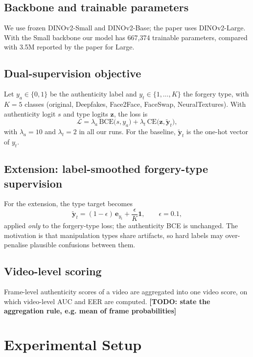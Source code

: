 \documentclass[lettersize,journal]{IEEEtran}
\newcommand{\todo}[1]{\textbf{[TODO: #1]}}
\begin{document}
\subsection{Backbone and trainable parameters}
We use frozen DINOv2-Small and DINOv2-Base; the paper uses DINOv2-Large. With the Small backbone our model has 667{,}374 trainable parameters, compared with 3.5M reported by the paper for Large.

\subsection{Dual-supervision objective}
Let $y_a\in\{0,1\}$ be the authenticity label and $y_t\in\{1,\dots,K\}$ the forgery type, with $K=5$ classes (original, Deepfakes, Face2Face, FaceSwap, NeuralTextures). With authenticity logit $s$ and type logits $\mathbf{z}$, the loss is
\begin{equation}
\mathcal{L}=\lambda_a\,\mathrm{BCE}\big(s,y_a\big)+\lambda_t\,\mathrm{CE}\big(\mathbf{z},\tilde{\mathbf{y}}_t\big),
\label{eq:loss}
\end{equation}
with $\lambda_a=10$ and $\lambda_t=2$ in all our runs. For the baseline, $\tilde{\mathbf{y}}_t$ is the one-hot vector of $y_t$.

\subsection{Extension: label-smoothed forgery-type supervision}
For the extension, the type target becomes
\begin{equation}
\tilde{\mathbf{y}}_t=(1-\epsilon)\,\mathbf{e}_{y_t}+\frac{\epsilon}{K}\mathbf{1},\qquad \epsilon=0.1,
\label{eq:ls}
\end{equation}
applied \emph{only} to the forgery-type loss; the authenticity BCE is unchanged. The motivation is that manipulation types share artifacts, so hard labels may over-penalise plausible confusions between them.

\subsection{Video-level scoring}
Frame-level authenticity scores of a video are aggregated into one video score, on which video-level AUC and EER are computed. \todo{state the aggregation rule, e.g. mean of frame probabilities}

\section{Experimental Setup}
\end{document}
